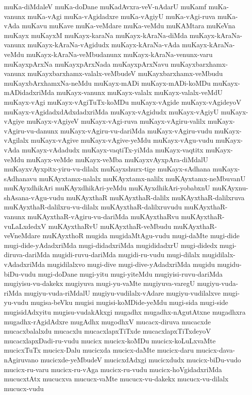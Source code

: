 {muKa-diMdaleV
muKa-doDane
muKadAvxra-veV-nAdarU
muKamf
muKa-vanunx
muKa-vAgi
muKa-vAgidadxre
muKa-vAgiyU
muKa-vAgi-ruva
muKa-vAda
muKavu
muKave
muKa-veMdare
muKa-veMdu
muKAMtara
muKeVna
muKayx
muKayxM
muKayx-karaNa
muKayx-kAraNa-diMda
muKayx-kAraNa-vanunx
muKayx-kAraNa-vAgidudx
muKayx-kAraNa-vAda
muKayx-kAraNa-veMdu
muKayx-kAraNa-veMbudanunx
muKayx-kAraNa-venunx-varu
muKayxpArxNa
muKayxpArxNada
muKayxpArxNavu
muKayxbarxhamx-vanunx
muKayxbarxhamx-valalx-veMbudeV
muKayxbarxhamx-veMbudu
muKayxbArxhamxNa-neMdu
muKayx-mADi
muKayx-mADi-koMDu
muKayx-mADidadxriMda
muKayx-vanunx
muKayx-valalx
muKayx-valalx-veMdU
muKayx-vAgi
muKayx-vAgiTuTx-koMDu
muKayx-vAgide
muKayx-vAgideyoV
muKayx-vAgidadxdAdxdadxriMda
muKayx-vAgidudx
muKayx-vAgiyU
muKayx-vAgiye
muKayx-vAgiyeV
muKayx-vAgi-ruva
muKayx-vAgiru-valilx
muKayx-vAgiru-vu-danunx
muKayx-vAgiru-vu-dariMda
muKayx-vAgiru-vudu
muKayx-vAgilalx
muKayx-vAgive
muKayx-vAgive-yeMdu
muKayx-vAgu-vudu
muKayx-vAda
muKayx-vAdadudx
muKayx-vaqtiTx-yiMda
muKayx-vaqtitx
muKayx-veMdu
muKayx-veMde
muKayx-veMba
muKayxvAyxpAra-diMdalU
muKayxvAyxpitx-yiru-vu-dilalx
muKayxshurx-tige
muKayx-sAdhana
muKayx-sAdhanavu
muKAyxtamx-nalalx
muKAyxtamx-nalilx
muKAyxtamx-neMbuvanU
muKAyxdhikAri
muKAyxdhikAri-yeMdu
muKAyxdhikAri-yobabxnU
muKAyxnu-shAsana-vAgu-vudu
muKAyxthaR
muKAyxthaR-dalilx
muKAyxthaR-dalilxruva
muKAyxthaR-dalilxru-vu-dilalx
muKAyxthaR-dalilxruvudu
muKAyxthaR-vanunx
muKAyxthaR-vAgiru-vu-dariMda
muKAyxthaRvu
muKAyxthaR-vuLaLxdedxV
muKAyxthaRvU
muKAyxthaR-veMbudu
muKAyxthaR-veVneMdare
muKAyxthoR
mugida
mugidaMtAgu-vudu
mugi-daMte
mugi-dide
mugi-dide-yAdadxriMda
mugi-didadxriMda
mugididadxrU
mugi-didedx
mugi-diruva-dariMda
mugidi-ruvu-dariMda
mugidi-ru-vudu
mugi-dilalx
mugidilalx-vAdadxriMda
mugidilalxvo
mugi-dive
mugi-dive-yAdadxriMda
mugidu
mugidu-biDu-vudu
mugi-doDane
mugi-yitu
mugi-yiteMdu
mugiyisi-ruvu-dariMda
mugiyisu-vu-dakekx
mugiyuva
mugi-yu-vaMte
mugiyuva-varegU
mugiyu-vuda-riMda
mugiyu-vuda-riMdalU
mugiyu-vudilalx-vAdare
mugiyu-vudilalxve
mugi-yu-vudu
mugisa-beVku
mugisi
mugisi-koMDide-yeMdu
mugi-sida
mugi-side
mugisidAdxyitu
mugisu-vudakAkxgi
mugadhx
mugadhx-nAgutAtxne
mugadhxra
mugadhx-rAgidAdxre
mugAdhx
mugodhxV
mucacx-diruva
mucacxde
mucacxbalalxdu
mucacxlu
mucacxlapxTiTxde
mucacxlapxTiTxdeyoV
mucacxlapxDadi-ru-vudu
mucicx
mucicx-koMDu
mucicx-koLuLxvaMte
mucicxTuTx
mucicx-Dalu
mucicxda
mucicx-daMte
mucicx-daru
mucicx-dava-nAgiruvano
mucicxde-yeMbudeV
mucicxdAdxgi
mucicxdudx
mucicx-biDu-vudo
mucicx-ru-varu
mucicx-ru-vAga
mucicx-ru-vudu
mucicx-hoVgidadxriMda
mucucxtAtx
mucucxva
mucucx-vaMte
mucucx-vu-dakekx
mucucx-vu-dilalx
mucucx-vudu
}
